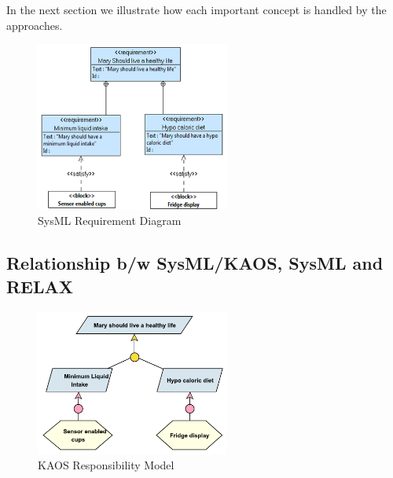 \documentclass[10pt, conference, compsocconf]{IEEEtran}
\begin{document}
In the next section we illustrate how each important concept is handled by the approaches.

\begin{figure}[!t]
\centering
\includegraphics[width=2.5in]{fig14}
\caption{SysML Requirement Diagram}
\label{fig:ReqDiag}
\end{figure}


\subsection{Relationship b/w SysML/KAOS, SysML and RELAX}

\begin{figure}[!t]
\centering
\includegraphics[width=2.5in]{fig12}
\caption{KAOS Responsibility Model}
\label{fig:KAOSModel}
\end{figure}
\end{document}
